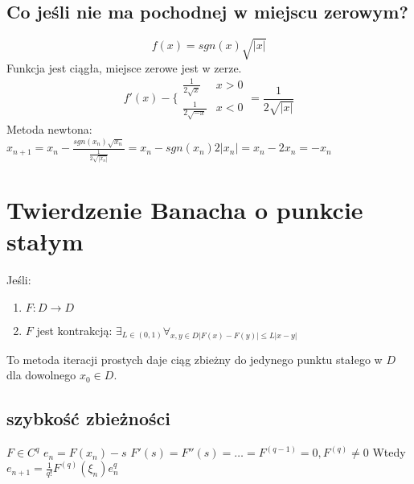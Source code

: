 \documentclass{article}
\begin{document}
\subsection{Co jeśli nie ma pochodnej w miejscu zerowym?}
$$ f(x) =sgn(x)\sqrt{|x|}$$
Funkcja jest ciągła, miejsce zerowe jest w zerze.
$$f'(x)-\bigg\{\begin{matrix}
	\frac{1}{2\sqrt x} & x>0\\
	\frac{1}{2\sqrt {-x}} & x<0
\end{matrix}=\frac{1}{2\sqrt{|x|}}$$
Metoda newtona:
$ x_{n+1}=x_n-\frac{sgn(x_n)\sqrt{x_n}}{\frac{1}{2\sqrt{|x_n|}}}=x_n-sgn(x_n)2|x_n|=x_n-2x_n=-x_n $
\section{Twierdzenie Banacha o punkcie stałym}
Jeśli:
\begin{enumerate}
	\item $ F:D \rightarrow D $
	\item $F$ jest kontrakcją: $ \exists_{L\in(0,1)}\forall_{x, y\in D|F(x)-F(y)|\le L|x-y|} $
\end{enumerate}
To metoda iteracji prostych daje ciąg zbieżny do jedynego punktu stałego w $ D $ dla dowolnego $ x_0\in D $.
\subsection{szybkość zbieżności}
$ F\in C^q $
$ e_n=F(x_n)-s$
$F'(s)=F''(s)=\dots=F^{(q-1)}=0, F^{(q)}\not=0$
Wtedy $ e_{n+1}=\frac{1}{q!}F^{(q)}(\xi_n)e_n^q $
\end{document}
